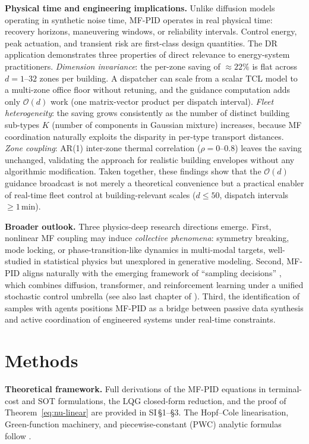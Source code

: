 \documentclass[11pt,onecolumn]{article}
\begin{document}
\textbf{Physical time and engineering implications.} Unlike diffusion models operating in synthetic noise time, MF-PID operates in real physical time: recovery horizons, maneuvering windows, or reliability intervals. Control energy, peak actuation, and transient risk are first-class design quantities. The DR application demonstrates three properties of direct relevance to energy-system practitioners. \emph{Dimension invariance}: the per-zone saving of $\approx22\%$ is flat across $d=1$--$32$ zones per building. A dispatcher can scale from a scalar TCL model to a multi-zone office floor without retuning, and the guidance computation adds only $\mathcal{O}(d)$ work (one matrix-vector product per dispatch interval). \emph{Fleet heterogeneity}: the saving grows consistently as the number of distinct building sub-types $K$ (number of components in Gaussian mixture) increases, because MF coordination naturally exploits the disparity in per-type transport distances. \emph{Zone coupling}: AR(1) inter-zone thermal correlation ($\rho=0$--$0.8$) leaves the saving unchanged, validating the approach for realistic building envelopes without any algorithmic modification. Taken together, these findings show that the $\mathcal{O}(d)$ guidance broadcast is not merely a theoretical convenience but a practical enabler of real-time fleet control at building-relevant scales ($d\leq 50$, dispatch intervals $\geq\!1$\,min).

\textbf{Broader outlook.} Three physics-deep research directions emerge. First, nonlinear MF coupling may induce \emph{collective phenomena}: symmetry breaking, mode locking, or phase-transition-like dynamics in multi-modal targets, well-studied in statistical physics but unexplored in generative modeling. Second, MF-PID aligns naturally with the emerging framework of ``sampling decisions'' \cite{chertkov_sampling_2025}, which combines diffusion, transformer, and reinforcement learning under a unified stochastic control umbrella (see also last chapter of \cite{chertkov_mathematics_2025}). Third, the identification of samples with agents positions MF-PID as a bridge between passive data synthesis and active coordination of engineered systems under real-time constraints.

\section*{Methods}
\label{sec:methods}

\textbf{Theoretical framework.} Full derivations of the MF-PID equations in terminal-cost and SOT formulations, the LQG closed-form reduction, and the proof of Theorem~\eqref{eq:nu-linear} are provided in SI\,\S1--\S3. The Hopf--Cole linearisation, Green-function machinery, and piecewise-constant (PWC) analytic formulas follow \cite{behjoo_harmonic_2025,chertkov_adaptive_2025,chertkov_generative_2025}.
\end{document}
